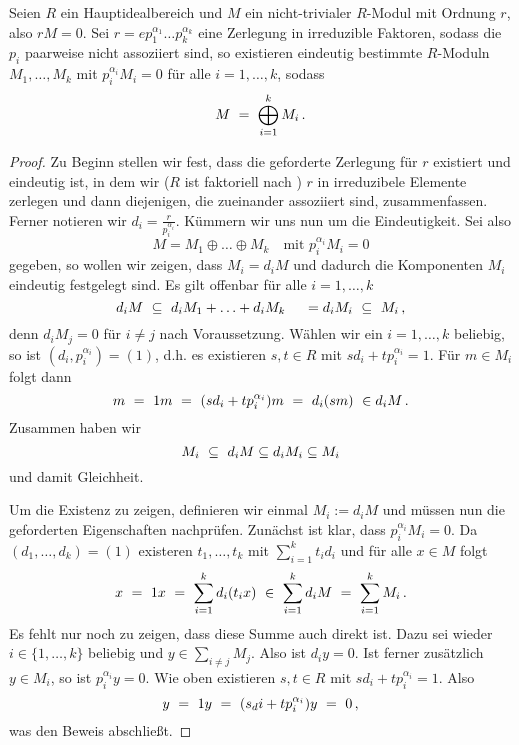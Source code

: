 \begin{satz}
  \label{satz:zerlegungssatz_moduln}
  Seien $R$ ein Hauptidealbereich und 
  $M$ ein nicht-trivialer $R$-Modul mit Ordnung $r$, also $rM = 0$.
  Sei $r = e p_1^{\alpha_1}\ldots p_k^{\alpha_k}$ eine Zerlegung in irreduzible
  Faktoren, sodass die $p_i$ paarweise nicht assoziiert sind, 
  so existieren eindeutig bestimmte $R$-Moduln 
  $M_1,\ldots,M_k$ mit $p_i^{\alpha_i}M_i = 0$ für alle $i=1,\ldots,k$, sodass
  \[ M \ =\  \bigoplus_{i=1}^k M_i\,.\]
\end{satz}
\begin{proof}
  Zu Beginn stellen wir fest, dass die geforderte Zerlegung für $r$ existiert
  und eindeutig ist, in dem wir ($R$ ist faktoriell nach 
  ) $r$ in irreduzibele
  Elemente zerlegen und dann diejenigen, die zueinander assoziiert sind,
  zusammenfassen. Ferner notieren wir $d_i = \frac{r}{p_i^{\alpha_i}}$.
  Kümmern wir uns nun um die Eindeutigkeit. Sei also 
  \[ M = M_1 \oplus \ldots \oplus M_k \quad\text{mit } p_i^{\alpha_i} M_i = 0\]
  gegeben, so wollen wir zeigen, dass $M_i = d_i M$ und dadurch die Komponenten
  $M_i$ eindeutig festgelegt sind. Es gilt offenbar für alle $i=1,\ldots,k$
  \[ d_i M \ \subseteq\  d_i M_1 + \ldots + d_i M_k \ \ \ \ = d_i M_i 
    \ \subseteq\  M_i\,,\]
  denn $d_i M_j = 0$ für $i\neq j$ nach Voraussetzung. 
  Wählen wir ein $i = 1,\ldots,k$ beliebig, so ist 
  $(d_i, p_i^{\alpha_i}) = (1)$, d.h. es existieren $s,t \in R$ mit
  $sd_i + t p_i^{\alpha_i} = 1$. Für $m\in M_i$ folgt dann
  \[ m \speq= 1m \speq= (sd_i + tp_i^{\alpha_i})m \speq= d_i (sm)\ 
    \in d_i M\,. \]
  Zusammen haben wir 
  \[ M_i \ \subseteq\  d_iM \subseteq d_iM_i \subseteq M_i\]
  und damit Gleichheit.

  Um die Existenz zu zeigen, definieren wir einmal $M_i := d_iM$ und müssen nun
  die geforderten Eigenschaften nachprüfen. Zunächst ist klar, dass
  $p_i^{\alpha_i}M_i = 0$. Da $(d_1,\ldots,d_k) = (1)$ existeren 
  $t_1,\ldots,t_k$ mit $\sum_{i=1}^kt_id_i$ und für alle $x \in M$ folgt
  \[ x \ =\  1x \ =\  \sum_{i=1}^k d_i(t_ix) 
    \ \in\  \sum_{i=1}^k d_iM \ =\  \sum_{i=1}^k M_i\,.\]
  Es fehlt nur noch zu zeigen, dass diese Summe auch direkt ist. 
  Dazu sei wieder $i\in\{1,\ldots,k\}$ beliebig und 
  $y \in \sum_{i\neq j} M_j$. Also ist $d_iy = 0$. Ist ferner zusätzlich
  $y \in M_i$, so ist $p_i^{\alpha_i}y = 0$. Wie oben existieren $s,t \in R$
  mit $sd_i + tp_i^{\alpha_i} = 1$. Also
  \[ y \ =\  1y \ =\  (s_di + tp_i^{\alpha_i})y \ =\  0\,,\]
  was den Beweis abschließt.
\end{proof}



